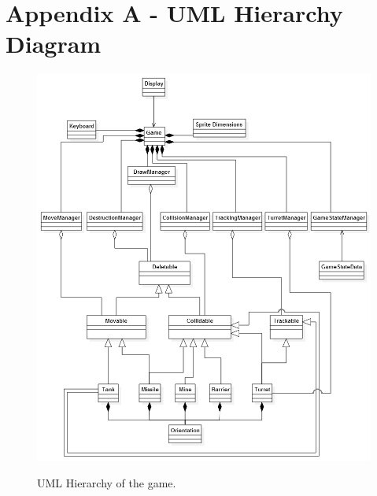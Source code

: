 \documentclass[10pt,a4paper]{report}
\author{Daniel G. Holmes}
\begin{document}
\section*{Appendix A - UML Hierarchy Diagram}

\begin{figure}[h]
	\centering
		\includegraphics[keepaspectratio=true, scale=0.73]{uml-hierarchy}
	\label{top}
	\caption{UML Hierarchy of the game.}
\end{figure}
\end{document}
